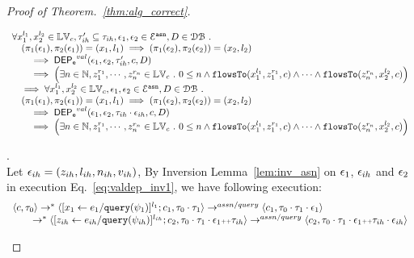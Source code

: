 \begin{proof}[Proof of Theorem.~\ref{thm:alg_correct}]
\begin{case}
$$\begin{array}{l}
\forall {x}_1^{l_1}, {x}_2^{l_2} \in \mathbb{LV}_{{c}}, \mathtt{\tau}_{ih}' \subseteq \mathtt{\tau}_{ih},
\mathtt{\epsilon}_1, \mathtt{\epsilon}_2 \in \mathcal{E}^{\mathtt{{asn}}}, D \in \mathcal{DB} ~.~
\\ \quad
(\pi_{1}{(\mathtt{\epsilon}_1)}, \pi_{2}{(\mathtt{\epsilon}_1)}) = ({x}_1, l_1)
\implies
(\pi_{1}{(\mathtt{\epsilon}_2)}, \pi_{2}{(\mathtt{\epsilon}_2)}) = ({x}_2, l_2)
 \\ \qquad \implies 
\mathsf{DEP_{\mathtt{e}}}^{val}(\mathtt{\epsilon}_1, \mathtt{\epsilon}_2, \mathtt{\tau}_{ih}', c, D)
 \\ \qquad \implies
   \Big(\exists  n \in \mathbb{N}, z_1^{r_1}, \cdots, z_n^{r_n} \in \mathbb{LV}_{{c}} ~.~ 0 \leq n
 \land \mathtt{flowsTo}(x_1^{l_1}, z_1^{r_1}, c) \land \cdots \land \mathtt{flowsTo}(z_n^{r_n}, {x}_2^{l_2}, c) \Big)
\\ \quad \implies
\forall {x}_1^{l_1}, {x}_2^{l_2} \in \mathbb{LV}_{{c}},
\mathtt{\epsilon}_1, \mathtt{\epsilon}_2 \in \mathcal{E}^{\mathtt{{asn}}}, D \in \mathcal{DB} ~.~
\\ \quad
(\pi_{1}{(\mathtt{\epsilon}_1)}, \pi_{2}{(\mathtt{\epsilon}_1)}) = ({x}_1, l_1)
\implies
(\pi_{1}{(\mathtt{\epsilon}_2)}, \pi_{2}{(\mathtt{\epsilon}_2)}) = ({x}_2, l_2)
 \\ \qquad \implies 
\mathsf{DEP_{\mathtt{e}}}^{val}(\mathtt{\epsilon}_1, \mathtt{\epsilon}_2, \mathtt{\tau}_{ih} \cdot \mathtt{\epsilon}_{ih}, c, D)
 \\ \qquad \implies
   \Big(\exists  n \in \mathbb{N}, z_1^{r_1}, \cdots, z_n^{r_n} \in \mathbb{LV}_{{c}} ~.~ 0 \leq n
 \land \mathtt{flowsTo}(x_1^{l_1}, z_1^{r_1}, c) \land \cdots \land \mathtt{flowsTo}(z_n^{r_n}, {x}_2^{l_2}, c) \Big)
\end{array}
$$
%
\begin{subcase}
\label{case:valdep_ihindep}.
\\
Let $\mathtt{\epsilon}_{ih} = (z_{ih}, l_{ih}, n_{ih}, v_{ih})$, 
%
By Inversion Lemma~\ref{lem:inv_asn} on $\mathtt{\epsilon}_1$, $\mathtt{\epsilon}_{ih}$ and $\mathtt{\epsilon}_2$ in execution Eq.~\ref{eq:valdep_inv1}, we have following execution:
\begin{equation}
\label{eq:m1asn_inv1}
  \begin{array}{l}   
\langle {c}, \mathtt{\tau}_0 \rangle \rightarrow^{*} 
\langle [\mathrel{ {x}_1 \leftarrow e_1 / {\tt query}(\psi_1) }]^{l_1} ; {c}_1, \mathtt{\tau}_0 \cdot \mathtt{\tau}_1 \rangle  \rightarrow^{assn/query}
 \langle c_1, \mathtt{\tau}_0 \cdot \mathtt{\tau}_1 \cdot \mathtt{\epsilon}_1 \rangle \\
  \qquad \rightarrow^{*} 
  \langle [\mathrel{ z_{ih} \leftarrow e_{ih} / {\tt query}(\psi_{ih}) }]^{l_{ih}};{c}_2, 
  \mathtt{\tau}_0 \cdot \mathtt{\tau}_1 \cdot \mathtt{\epsilon}_1 {\scriptscriptstyle ++} \mathtt{\tau}_{ih} \rangle 
  \rightarrow^{assn/query} 
  \langle {c}_2,  \mathtt{\tau}_0 \cdot \mathtt{\tau}_1 \cdot \mathtt{\epsilon}_1 {\scriptscriptstyle ++} \mathtt{\tau}_{ih} \cdot \mathtt{\epsilon}_{ih} \rangle  \\

\end{array}
\end{equation}
\end{subcase}
\end{case}
\end{proof}
